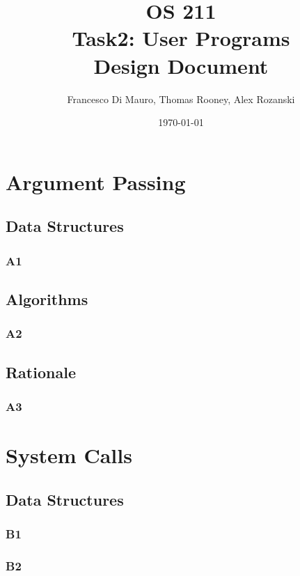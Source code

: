 \documentclass[a4wide, 11pt]{article}
\begin{document}
\title{OS 211 \\ Task2: User Programs \\ Design Document}
\author{Francesco Di Mauro, Thomas Rooney, Alex Rozanski}
\date{\today}
\maketitle

\section{Argument Passing}
\subsection{Data Structures}
\subsubsection{A1}

\subsection{Algorithms}
\subsubsection{A2}

\subsection{Rationale}
\subsubsection{A3}


\section{System Calls}
\subsection{Data Structures}
\subsubsection{B1}

\subsubsection{B2}
\end{document}
